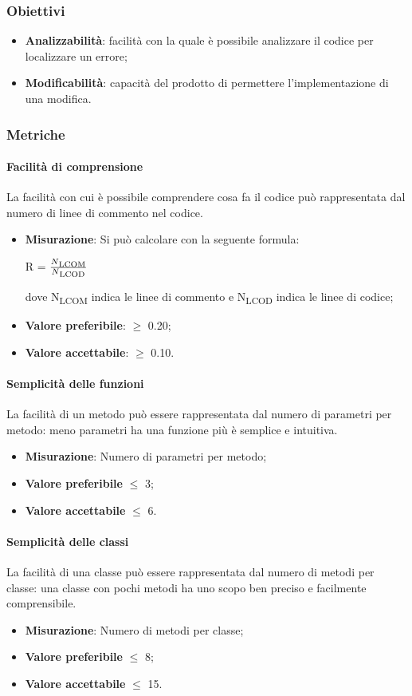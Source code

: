 		\subsubsection{Obiettivi}
		\begin{itemize}
			\item \textbf{Analizzabilità}: facilità con la quale è possibile analizzare il codice per localizzare un errore;
			\item \textbf{Modificabilità}: capacità del prodotto di permettere l'implementazione di una modifica.
		\end{itemize}
		\subsubsection{Metriche}
			\paragraph{Facilità di comprensione}
			La facilità con cui è possibile comprendere cosa fa il codice può rappresentata dal numero di linee di commento nel codice.
			\begin{itemize}
			\item \textbf{Misurazione}: Si può calcolare con la seguente formula: \\
			\centerline{R = \(\frac{N\textsubscript{LCOM}}{N\textsubscript{LCOD}} \) }
			dove N\textsubscript{LCOM} indica le linee di commento e N\textsubscript{LCOD} indica le linee di codice;
			\item\textbf{Valore preferibile}: $\geq$ 0.20;
			\item \textbf{Valore accettabile}: $\geq$ 0.10.
			\end{itemize}
			\paragraph{Semplicità delle funzioni}
			La facilità di un metodo può essere rappresentata dal numero di parametri per metodo: meno parametri ha una funzione più è semplice e intuitiva.
			\begin{itemize}
			\item \textbf{Misurazione}: Numero di parametri per metodo;
			\item\textbf{Valore preferibile} $\leq$ 3;
			\item \textbf{Valore accettabile} $\leq$ 6.
			\end{itemize}
			\paragraph{Semplicità delle classi}
			La facilità di una classe può essere rappresentata dal numero di metodi per classe: una classe con pochi metodi ha uno scopo ben preciso e facilmente comprensibile.
			\begin{itemize}
			\item \textbf{Misurazione}: Numero di metodi per classe;
			\item\textbf{Valore preferibile} $\leq$ 8;
			\item \textbf{Valore accettabile} $\leq$ 15.
			\end{itemize}
\pagebreak
